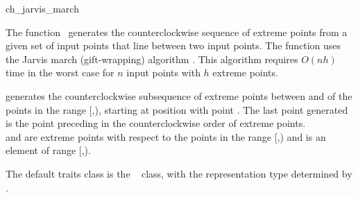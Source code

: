 
\begin{ccRefFunction}{ch_jarvis_march}  %

\ccDefinition
  
The function \ccRefName\ generates the counterclockwise sequence of extreme
points from a given set of input points that line between two input points.
The function uses the Jarvis march (gift-wrapping)
algorithm \cite{j-ichfs-73}. This algorithm requires $O(n h)$ time 
in the worst case for $n$ input points with $h$ extreme points.  


            {generates the counterclockwise subsequence of
             extreme points between  and  of the 
             points in the range [,), starting at 
             position  with point .  The last point 
             generated is the point preceding  in the 
             counterclockwise order of extreme points.\\
            \ccPrecond%
             and  are extreme points with respect to
            the points in the range [,) and 
            is an element of range [,).}


The default traits class  is the \cgal\
 class,%
with the representation type determined by .



\end{ccRefFunction}

